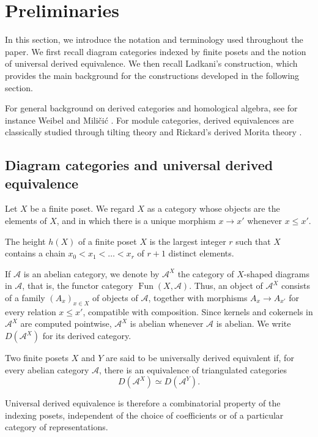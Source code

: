\section{Preliminaries}

In this section, we introduce the notation and terminology used throughout the paper. We first recall diagram categories indexed by finite posets and the notion of universal derived equivalence. We then recall Ladkani's construction, which provides the main background for the constructions developed in the following section.

For general background on derived categories and homological algebra, see for instance  Weibel \cite{weibel} and Miličić \cite{dercat}.
For module categories, derived equivalences are classically studied through tilting theory and Rickard's derived Morita theory \cite{Rickard}.

\subsection{Diagram categories and universal derived equivalence}

Let $X$ be a finite poset. We regard $X$ as a category whose objects are the elements of $X$, and in which there is a unique morphism $x \to x'$ whenever $x \leq x'$.

The height $h(X)$ of a finite poset $X$ is the largest integer $r$ such that $X$ contains a chain $x_0<x_1< \dots <x_r$ of $r+1$ distinct elements.

If $\mathcal{A}$ is an abelian category, we denote by $\mathcal{A}^X$ the category of $X$-shaped diagrams in $\mathcal{A}$, that is, the functor category $\operatorname{Fun}(X,\mathcal{A})$. Thus, an object of $\mathcal{A}^X$ consists of a family $(A_x)_{x \in X}$ of objects of $\mathcal{A}$, together with morphisms $A_x \to A_{x'}$ for every relation $x \le x'$, compatible  with composition. Since kernels and cokernels in $\mathcal{A}^X$ are computed pointwise, $\mathcal{A}^X$ is abelian whenever $\mathcal{A}$ is abelian. We write $D(\mathcal{A}^X)$ for its derived category. 

Two finite posets $X$ and $Y$ are said to be universally derived equivalent \cite{ladkani} if, for every abelian category $\mathcal{A}$, there is an equivalence of triangulated categories
\[D(\mathcal{A}^X) \simeq D(\mathcal{A}^Y).\] 

Universal derived equivalence is therefore a combinatorial property of the indexing posets, independent of the choice of coefficients or of a particular category of representations.
